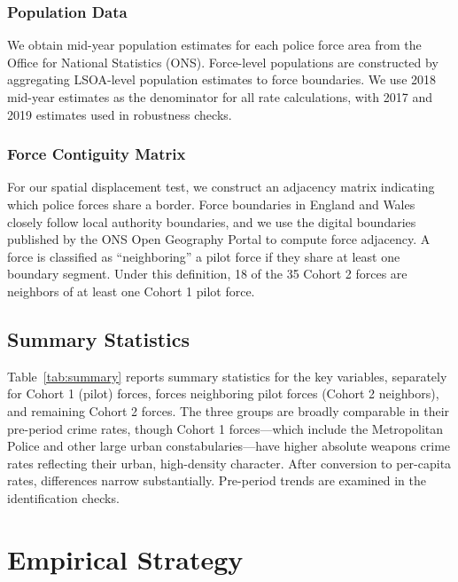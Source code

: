 \documentclass[12pt]{article}
\begin{document}
\subsubsection*{Population Data}

We obtain mid-year population estimates for each police force area from the Office for National Statistics (ONS). Force-level populations are constructed by aggregating LSOA-level population estimates to force boundaries. We use 2018 mid-year estimates as the denominator for all rate calculations, with 2017 and 2019 estimates used in robustness checks.

\subsubsection*{Force Contiguity Matrix}

For our spatial displacement test, we construct an adjacency matrix indicating which police forces share a border. Force boundaries in England and Wales closely follow local authority boundaries, and we use the digital boundaries published by the ONS Open Geography Portal to compute force adjacency. A force is classified as ``neighboring'' a pilot force if they share at least one boundary segment. Under this definition, 18 of the 35 Cohort 2 forces are neighbors of at least one Cohort 1 pilot force.

\subsection{Summary Statistics}
\label{sec:summary}

Table~\ref{tab:summary} reports summary statistics for the key variables, separately for Cohort 1 (pilot) forces, forces neighboring pilot forces (Cohort 2 neighbors), and remaining Cohort 2 forces. The three groups are broadly comparable in their pre-period crime rates, though Cohort 1 forces---which include the Metropolitan Police and other large urban constabularies---have higher absolute weapons crime rates reflecting their urban, high-density character. After conversion to per-capita rates, differences narrow substantially. Pre-period trends are examined in the identification checks.




\section{Empirical Strategy}
\label{sec:strategy}
\end{document}
